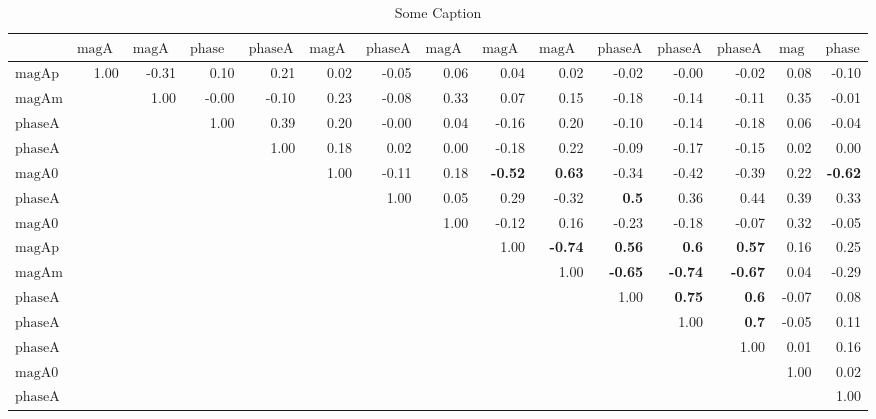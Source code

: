 \small
\renewcommand*{\arraystretch}{1.}
\renewcommand{\pm}{\ensuremath{\oldpm} }
\begin{sidewaystable}[h]
\begin{center}
\begin{tabular}{@{}|l|r|r|r|r|r|r|r|r|r|r|r|r|r|r|@{}}
\hline
 & $\text{magApKst892}$ & $\text{magAmKst892}$ & $\text{phaseApKst892}$ & $\text{phaseAmKst892}$ & $\text{magA0K01430}$ & $\text{phaseA0K01430}$ & $\text{magA0K21430}$ & $\text{magApK21430}$ & $\text{magAmK21430}$ & $\text{phaseA0K21430}$ & $\text{phaseApK21430}$ & $\text{phaseAmK21430}$ & $\text{magA0NR}$ & $\text{phaseA0NR}$\\ \hline \hline
$\text{magApKst892}$ & 1.00 & -0.31 & 0.10 & 0.21 & 0.02 & -0.05 & 0.06 & 0.04 & 0.02 & -0.02 & -0.00 & -0.02 & 0.08 & -0.10 \\
$\text{magAmKst892}$ &  & 1.00 & -0.00 & -0.10 & 0.23 & -0.08 & 0.33 & 0.07 & 0.15 & -0.18 & -0.14 & -0.11 & 0.35 & -0.01 \\
$\text{phaseApKst892}$ &  &  & 1.00 & 0.39 & 0.20 & -0.00 & 0.04 & -0.16 & 0.20 & -0.10 & -0.14 & -0.18 & 0.06 & -0.04 \\
$\text{phaseAmKst892}$ &  &  &  & 1.00 & 0.18 & 0.02 & 0.00 & -0.18 & 0.22 & -0.09 & -0.17 & -0.15 & 0.02 & 0.00 \\
$\text{magA0K01430}$ &  &  &  &  & 1.00 & -0.11 & 0.18 & \bf{-0.52} & \bf{0.63} & -0.34 & -0.42 & -0.39 & 0.22 & \bf{-0.62} \\
$\text{phaseA0K01430}$ &  &  &  &  &  & 1.00 & 0.05 & 0.29 & -0.32 & \bf{0.5} & 0.36 & 0.44 & 0.39 & 0.33 \\
$\text{magA0K21430}$ &  &  &  &  &  &  & 1.00 & -0.12 & 0.16 & -0.23 & -0.18 & -0.07 & 0.32 & -0.05 \\
$\text{magApK21430}$ &  &  &  &  &  &  &  & 1.00 & \bf{-0.74} & \bf{0.56} & \bf{0.6} & \bf{0.57} & 0.16 & 0.25 \\
$\text{magAmK21430}$ &  &  &  &  &  &  &  &  & 1.00 & \bf{-0.65} & \bf{-0.74} & \bf{-0.67} & 0.04 & -0.29 \\
$\text{phaseA0K21430}$ &  &  &  &  &  &  &  &  &  & 1.00 & \bf{0.75} & \bf{0.6} & -0.07 & 0.08 \\
$\text{phaseApK21430}$ &  &  &  &  &  &  &  &  &  &  & 1.00 & \bf{0.7} & -0.05 & 0.11 \\
$\text{phaseAmK21430}$ &  &  &  &  &  &  &  &  &  &  &  & 1.00 & 0.01 & 0.16 \\
$\text{magA0NR}$ &  &  &  &  &  &  &  &  &  &  &  &  & 1.00 & 0.02 \\
$\text{phaseA0NR}$ &  &  &  &  &  &  &  &  &  &  &  &  &  & 1.00 \\
\hline
\end{tabular}
\caption{Some Caption}
\label{thisTable}
\end{center}
\end{sidewaystable}
\renewcommand{\pm}{\oldpm}
\restoregeometry

